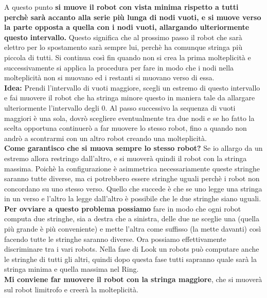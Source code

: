 A questo punto \textbf{si muove il robot con vista minima rispetto a tutti perchè sarà accanto alla serie più lunga di nodi vuoti, e si muove verso la parte opposta a quella con i nodi vuoti, allargando ulteriormente questo intervallo.} Questo significa che al prossimo passo il robot che sarà elettro per lo spostamento sarà sempre lui, perchè ha comunque stringa più piccola di tutti. Si continua così fin quando non si crea la prima molteplicità e successivamente si applica la procedura per fare in modo che i nodi nella molteplicità non si muovano ed i restanti si muovano verso di essa.\\

\textbf{Idea:} Prendi l'intervallo di vuoti maggiore, scegli un estremo di questo intervallo e fai muovere il robot che ha stringa minore questo in maniera tale da allargare ulteriormente l'intervallo degli 0. Al passo successivo la sequenza di vuoti maggiori è una sola, dovrò scegliere eventualmente tra due nodi e se ho fatto la scelta opportuna continuerò a far muovere lo stesso robot, fino a quando non andrò a scontrarmi con un altro robot creando una molteplicità.\\
\textbf{Come garantisco che si muova sempre lo stesso robot?} Se io allargo da un estremo allora restringo dall'altro, e si muoverà quindi il robot con la stringa massima.
Poichè la configurazione è asimmetrica necessariamente queste stringhe saranno tutte diverse, ma ci potrebbero essere stringhe uguali perchè i robot non concordano su uno stesso verso. Quello che succede è che se uno legge una stringa in un verso e l'altro la legge dall'altro è possibile che le due stringhe siano uguali.\\
\textbf{Per ovviare a questo problema possiamo} fare in modo che ogni robot computa due stringhe, sia a destra che a sinistra, delle due ne sceglie una (quella più grande è più conveniente) e mette l'altra come suffisso (la mette davanti) così facendo tutte le stringhe saranno diverse. Ora possiamo effettivamente discriminare tra i vari robots. Nella fase di Look un robots può computare anche le stringhe di tutti gli altri, quindi dopo questa fase tutti sapranno quale sarà la stringa minima e quella massima nel Ring.\\
\textbf{Mi conviene far muovere il robot con la stringa maggiore}, che si muoverà sul robot limitrofo e creerà la molteplicità.

